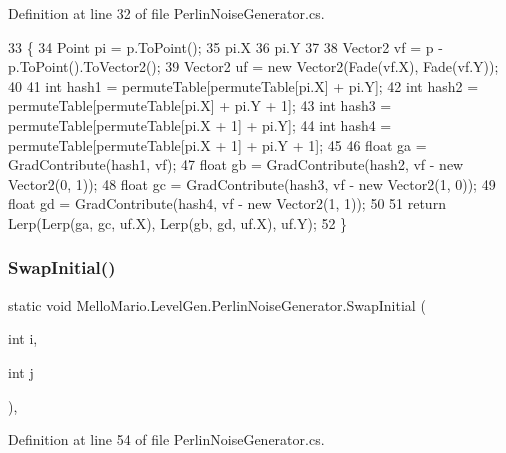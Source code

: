 Definition at line 32 of file Perlin\+Noise\+Generator.\+cs.


\begin{DoxyCode}
33         \{
34             Point pi = p.ToPoint();
35             pi.X %
36             pi.Y %
37 
38             Vector2 vf = p - p.ToPoint().ToVector2();
39             Vector2 uf = \textcolor{keyword}{new} Vector2(Fade(vf.X), Fade(vf.Y));
40 
41             \textcolor{keywordtype}{int} hash1 = permuteTable[permuteTable[pi.X] + pi.Y];
42             \textcolor{keywordtype}{int} hash2 = permuteTable[permuteTable[pi.X] + pi.Y + 1];
43             \textcolor{keywordtype}{int} hash3 = permuteTable[permuteTable[pi.X + 1] + pi.Y];
44             \textcolor{keywordtype}{int} hash4 = permuteTable[permuteTable[pi.X + 1] + pi.Y + 1];
45 
46             \textcolor{keywordtype}{float} ga = GradContribute(hash1, vf);
47             \textcolor{keywordtype}{float} gb = GradContribute(hash2, vf - \textcolor{keyword}{new} Vector2(0, 1));
48             \textcolor{keywordtype}{float} gc = GradContribute(hash3, vf - \textcolor{keyword}{new} Vector2(1, 0));
49             \textcolor{keywordtype}{float} gd = GradContribute(hash4, vf - \textcolor{keyword}{new} Vector2(1, 1));
50 
51             \textcolor{keywordflow}{return} Lerp(Lerp(ga, gc, uf.X), Lerp(gb, gd, uf.X), uf.Y);
52         \}
\end{DoxyCode}
\mbox{\label{classMelloMario_1_1LevelGen_1_1PerlinNoiseGenerator_acf11fbca3c64d01884233dabf6f43c73}} 
\subsubsection{Swap\+Initial()}
{\footnotesize\ttfamily static void Mello\+Mario.\+Level\+Gen.\+Perlin\+Noise\+Generator.\+Swap\+Initial (\begin{DoxyParamCaption}\item[{int}]{i,  }\item[{int}]{j }\end{DoxyParamCaption})\hspace{0.3cm}{\ttfamily [static]}, {\ttfamily [private]}}



Definition at line 54 of file Perlin\+Noise\+Generator.\+cs.


